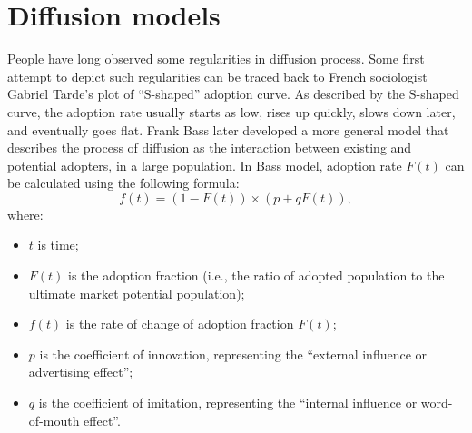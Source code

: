 \documentclass[phd,tocprelim]{cornell}
\begin{document}





\section{Diffusion models}

People have long observed some regularities in diffusion process. Some first attempt to depict such regularities can be traced back to French sociologist Gabriel Tarde's plot of ``S-shaped'' adoption curve\cite{Tarde-1903}. As described by the S-shaped curve, the adoption rate usually starts as low, rises up quickly, slows down later, and eventually goes flat. Frank Bass later developed a more general model that describes the process of diffusion as the interaction between existing and potential adopters, in a large population\cite{Bass:1969}. In Bass model, adoption rate $F(t)$ can be calculated using the following formula:
\begin{equation}
f(t) = (1 - F(t))\times(p + qF(t)),
\end{equation}
\noindent
where:
\vspace{-8pt}
\begin{itemize}
\item $t$ is time;
\item $F(t)$ is the adoption fraction (i.e., the ratio of adopted population to the ultimate market potential population);
\item $f(t)$ is the rate of change of adoption fraction $F(t)$;
\item $p$ is the coefficient of innovation, representing the ``external influence or advertising effect'';
\item $q$ is the coefficient of imitation, representing the ``internal influence or word-of-mouth effect''.
\end{itemize}
\end{document}

